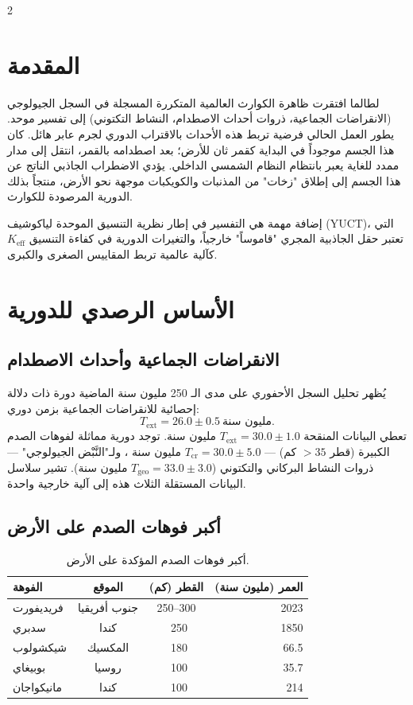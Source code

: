 \documentclass[11pt,a4paper]{article}
\begin{document}
	\begin{multicols}{2}
		
		\section{المقدمة}
		لطالما افتقرت ظاهرة الكوارث العالمية المتكررة المسجلة في السجل الجيولوجي (الانقراضات الجماعية، ذروات أحداث الاصطدام، النشاط التكتوني) إلى تفسير موحد. يطور العمل الحالي فرضية تربط هذه الأحداث بالاقتراب الدوري لجرم عابر هائل. كان هذا الجسم موجوداً في البداية كقمر ثان للأرض؛ بعد اصطدامه بالقمر، انتقل إلى مدار ممدد للغاية يعبر بانتظام النظام الشمسي الداخلي. يؤدي الاضطراب الجاذبي الناتج عن هذا الجسم إلى إطلاق "زخات" من المذنبات والكويكبات موجهة نحو الأرض، منتجاً بذلك الدورية المرصودة للكوارث.
		
		إضافة مهمة هي التفسير في إطار نظرية التنسيق الموحدة لياكوشيف (YUCT)، التي تعتبر حقل الجاذبية المجري "قاموساً" خارجياً، والتغيرات الدورية في كفاءة التنسيق \(K_{\mathrm{eff}}\) كآلية عالمية تربط المقاييس الصغرى والكبرى.
		
		\section{الأساس الرصدي للدورية}
		\subsection{الانقراضات الجماعية وأحداث الاصطدام}
		يُظهر تحليل السجل الأحفوري على مدى الـ 250 مليون سنة الماضية \cite{Raup1984, Melott2010} دورة ذات دلالة إحصائية للانقراضات الجماعية بزمن دوري:
		\[
		T_{\text{ext}} = 26.0 \pm 0.5\ \text{مليون سنة}.
		\]
		تعطي البيانات المنقحة \(T_{\text{ext}} = 30.0 \pm 1.0\) مليون سنة. توجد دورية مماثلة لفوهات الصدم الكبيرة (قطر \(>35\) كم) — \(T_{\text{cr}} = 30.0 \pm 5.0\) مليون سنة \cite{RampinoStothers1984}، ولـ"النَّبْض الجيولوجي" — ذروات النشاط البركاني والتكتوني (\(T_{\text{geo}} = 33.0 \pm 3.0\) مليون سنة). تشير سلاسل البيانات المستقلة الثلاث هذه إلى آلية خارجية واحدة.
		
		\subsection{أكبر فوهات الصدم على الأرض}
		\begin{table}[htbp]
			\centering
			\caption{أكبر فوهات الصدم المؤكدة على الأرض.}
			\label{tab:craters}
			\footnotesize
			\begin{tabular}{lccr}
				\toprule
				\textbf{الفوهة} & \textbf{الموقع} & \textbf{القطر (كم)} & \textbf{العمر (مليون سنة)} \\
				\midrule
				فريديفورت & جنوب أفريقيا & 250–300 & 2023 \\
				سدبري & كندا & ~250 & 1850 \\
				شيكشولوب & المكسيك & ~180 & 66.5 \\
				بوبيغاي & روسيا & ~100 & 35.7 \\
				مانيكواجان & كندا & ~100 & 214 \\
				\bottomrule
			\end{tabular}
		\end{table}
		

\end{multicols}
\end{document}
